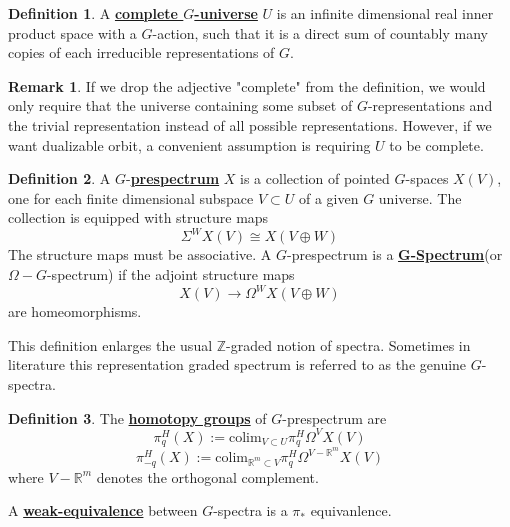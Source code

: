 \documentclass{article}
\theoremstyle{definition}
\theoremstyle{definition}
\newtheorem{definition}{Definition}[theorem]
\theoremstyle{definition}
\newtheorem{remark}{Remark}[theorem]
\theoremstyle{definition}
\theoremstyle{definition}
\theoremstyle{definition}
\theoremstyle{definition}
\begin{document}
\begin{tcolorbox}[colback=purple!5!white,colframe=purple!75!black]
\begin{definition}
A \underline{\textbf{complete $G$-universe}} $U$ is an infinite dimensional real inner product space with a $G$-action, such that it is a direct sum of countably many copies of each irreducible representations of $G$. 
\end{definition}
\end{tcolorbox}


\begin{tcolorbox}[colback=green!5!white,colframe=green!30!white]
\begin{remark}
If we drop the adjective "complete" from the definition, we would only require that the universe containing some subset of $G$-representations and the trivial representation instead of all possible representations. However, if we want dualizable orbit, a convenient assumption is requiring $U$ to be complete.  
\end{remark}
\end{tcolorbox}


\begin{tcolorbox}[colback=purple!5!white,colframe=purple!75!black]
\begin{definition}
A $G$-\underline{\textbf{prespectrum}} $X$ is a collection of pointed $G$-spaces $X(V)$, one for each finite dimensional subspace $V\subset U$ of a given $G$ universe. The collection is equipped with structure maps 
\[\Sigma^WX(V)\cong X(V\oplus W)\]
The structure maps must be associative. A $G$-prespectrum is a \underline{\textbf{G-Spectrum}}(or $\Omega-G$-spectrum) if the adjoint structure maps 
\[X(V)\to \Omega^WX(V\oplus W)\] 
are homeomorphisms.
\end{definition}
\end{tcolorbox}
This definition enlarges the usual $\mathbb{Z}$-graded notion of spectra. Sometimes in literature this representation graded spectrum is referred to as the genuine $G$-spectra. 


\begin{tcolorbox}[colback=purple!5!white,colframe=purple!75!black]
\begin{definition}
The \underline{\textbf{homotopy groups}} of $G$-prespectrum are 
\[\pi_q^H(X):=\textrm{colim}_{V\subset U}\pi_q^H\Omega^VX(V)\]
\[\pi_{-q}^H(X):=\textrm{colim}_{\mathbb{R}^m\subset V}\pi_q^H\Omega^{V-\mathbb{R}^m}X(V)\]
where $V-\mathbb{R}^m$ denotes the orthogonal complement. 

A \underline{\textbf{weak-equivalence}} between $G$-spectra is a $\pi_*$ equivanlence. 
\end{definition}
\end{tcolorbox}
\end{document}

